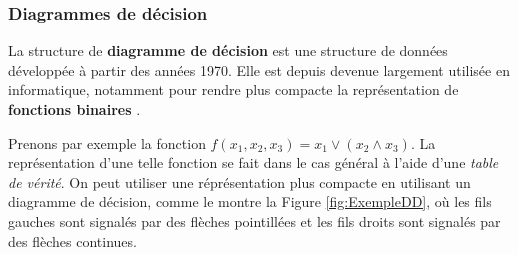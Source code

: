 \subsubsection*{Diagrammes de décision}

La structure de \textbf{diagramme de décision} est une structure de données développée à partir des années 1970. Elle est depuis devenue largement utilisée en informatique, notamment pour rendre plus compacte la représentation de \textbf{fonctions binaires} \cite{Minato_1996}.

Prenons par exemple la fonction $f(x_1, x_2, x_3) = x_1 \lor (x_2 \land x_3)$. La représentation d'une telle fonction se fait dans le cas général à l'aide d'une \textit{table de vérité}. On peut utiliser une réprésentation plus compacte en utilisant un diagramme de décision, comme le montre la Figure \ref{fig:ExempleDD}, où les fils gauches sont signalés par des flèches pointillées et les fils droits sont signalés par des flèches continues.

